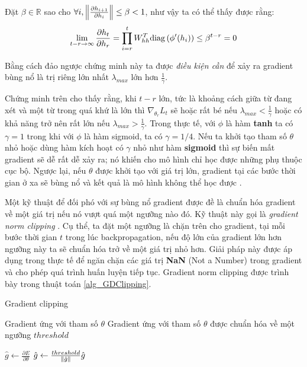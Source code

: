 Đặt $\beta \in \mathbb{R}$ sao cho $\forall i, \left\lVert\frac{\partial h_{i+1}}{\partial h_{i}}\right\rVert \leq \beta < 1$, như vậy ta có thể thấy được rằng:
\begin{equation} \label{gradientVanish6}
	\lim_{t - r \to \infty} \frac{\partial h_{t}}{\partial h_r} = \prod_{i=r}^{t} W_{hh}^T \mathrm{diag} \left(\phi'(h_i) \right) \leq \beta^{t - r} = 0
\end{equation}

Bằng cách đảo ngược chứng minh này ta được \textit{điều kiện cần} để xảy ra gradient bùng nổ là trị riêng lớn nhất $\lambda_{max}$ lớn hơn $\frac{1}{\gamma}$.

Chứng minh trên cho thấy rằng, khi $t-r$ lớn, tức là khoảng cách giữa từ đang xét và một từ trong quá khứ là lớn thì $\nabla_{\theta_r} L_t$ sẽ hoặc rất bé nếu $\lambda_{max} < \frac{1}{\gamma}$ hoặc có khả năng trở nên rất lớn nếu $\lambda_{max} > \frac{1}{\gamma}$. Trong thực tế, với $\phi$ là hàm \textbf{tanh} ta có $\gamma = 1$ trong khi với $\phi$ là hàm sigmoid, ta có $\gamma = 1/4$. Nếu ta khởi tạo tham số $\theta$ nhỏ hoặc dùng hàm kích hoạt có $\gamma$ nhỏ như hàm \textbf{sigmoid} thì sự biến mất gradient sẽ dễ rất dễ xảy ra; nó khiến cho mô hình chỉ học được những phụ thuộc cục bộ. Ngược lại, nếu $\theta$ được khởi tạo với giá trị lớn, gradient tại các bước thời gian ở xa sẽ bùng nổ và kết quả là mô hình không thể học được \cite{pascanu2011}.

Một kỹ thuật để đối phó với sự bùng nổ gradient được đề là chuẩn hóa gradient về một giá trị nếu nó vượt quá một ngưỡng nào đó. Kỹ thuật này gọi là \textit{gradient norm clipping} \cite{pascanu2011}. Cụ thể, ta đặt một ngưỡng là chặn trên cho gradient, tại mỗi bước thời gian $t$ trong lúc backpropagation, nếu độ lớn của gradient lớn hơn ngưỡng này ta sẽ chuẩn hóa trở về một giá trị nhỏ hơn. Giải pháp này được áp dụng trong thực tế để ngăn chặn các giá trị \textbf{NaN} (Not a Number) trong gradient và cho phép quá trình huấn luyện tiếp tục. Gradient norm clipping được trình bày trong thuật toán \ref{alg_GDClipping}.

\begin{algorithm}
	\caption{Gradient clipping}
	\label{alg_GDClipping}
	\begin{algorithmic}[1]
		\renewcommand{\algorithmicrequire}{\textbf{Đầu vào:}}
		\renewcommand{\algorithmicensure}{\textbf{Đầu ra:}}
		\algnewcommand{}
		\algnewcommand\Operation{\item[\algorithmicoperation]}
		
		\Require Gradient ứng với tham số $\theta$
		\Ensure Gradient ứng với tham số $\theta$ được chuẩn hóa về một ngưỡng $threshold$
		
		\Operation
		\State $\hat{g} \leftarrow \frac{\partial E}{\partial \theta}$
			\State $\hat{g} \leftarrow \frac{threshold}{\left\lVert\hat{g}\right\rVert} \hat{g}$
		\EndIf
	\end{algorithmic}
\end{algorithm}

